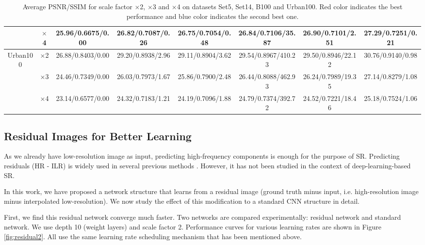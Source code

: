 \documentclass[10pt,twocolumn,letterpaper]{article}
\begin{document}
\begin{table}
\begin{center}
\begin{tabular}{ | c | c | c | c | c | c | c | c | }
 & $\times$4 & 25.96/0.6675/0.00 & 26.82/0.7087/{\color{blue}0.26} & 26.75/0.7054/0.48 & 26.84/{\color{blue}0.7106}/35.87 & {\color{blue}26.90}/0.7101/2.51 & {\color{red}27.29}/{\color{red}0.7251}/{\color{red}0.21}\\
\hline
\hline
\multirow{3}{*}{Urban100} & $\times$2 & 26.88/0.8403/0.00 & 29.20/0.8938/{\color{blue}2.96} & 29.11/0.8904/3.62 & {\color{blue}29.54}/{\color{blue}0.8967}/410.23 & 29.50/0.8946/22.12 & {\color{red}30.76}/{\color{red}0.9140}/{\color{red}0.98}\\
 & $\times$3 & 24.46/0.7349/0.00 & 26.03/0.7973/{\color{blue}1.67} & 25.86/0.7900/2.48 & {\color{blue}26.44}/{\color{blue}0.8088}/462.93 & 26.24/0.7989/19.35 & {\color{red}27.14}/{\color{red}0.8279}/{\color{red}1.08}\\
 & $\times$4 & 23.14/0.6577/0.00 & 24.32/0.7183/{\color{blue}1.21} & 24.19/0.7096/1.88 & {\color{blue}24.79}/{\color{blue}0.7374}/392.72 & 24.52/0.7221/18.46 & {\color{red}25.18}/{\color{red}0.7524}/{\color{red}1.06}\\
\hline
\end{tabular}
\caption{Average PSNR/SSIM for scale factor $\times$2, $\times$3 and $\times$4 on datasets Set5, Set14, B100 and Urban100. {\color{red}Red color} indicates the best performance and {\color{blue}blue color} indicates the second best one.}
\label{tbl:benchmark}
\end{center}
\end{table}


\subsection{Residual Images for Better Learning}
\label{sec:residual}

As we already have low-resolution image as input, predicting high-frequency components is enough for the purpose of SR. Predicting residuals (HR - ILR) is widely used in several previous methods \cite{Timofte2013, Timofte,zeyde2012single}. However, it has not been studied in the context of deep-learning-based SR.

In this work, we have proposed a network structure that learns from a residual image (ground truth minus input, i.e. high-resolution image minus interpolated low-resolution). We now study the effect of this modification to a standard CNN structure in detail. 

First, we find this residual network converge much faster. Two networks are compared experimentally: residual network and standard network. We use depth 10 (weight layers) and scale factor 2. Performance curves for various learning rates are shown in Figure \ref{fig:residual2}. All use the same learning rate scheduling mechanism that has been mentioned above. 
\end{document}
